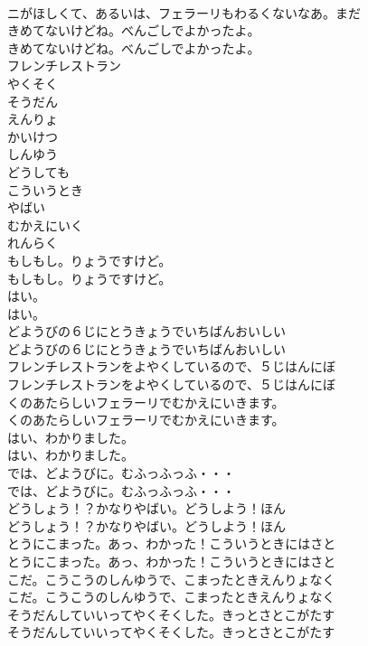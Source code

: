\documentclass[8pt]{extreport}
\begin{document}
\begin{CJK}{UTF8}{min}
\\	ニがほしくて、あるいは、フェラーリもわるくないなあ。まだ
\\	きめてないけどね。べんごしでよかったよ。
\\	きめてないけどね。べんごしでよかったよ。
\\	フレンチレストラン
\\	やくそく
\\	そうだん
\\	えんりょ
\\	かいけつ
\\	しんゆう
\\	どうしても
\\	こういうとき
\\	やばい
\\	むかえにいく
\\	れんらく
\\	もしもし。りょうですけど。
\\	もしもし。りょうですけど。
\\	はい。
\\	はい。
\\	どようびの６じにとうきょうでいちばんおいしい
\\	どようびの６じにとうきょうでいちばんおいしい
\\	フレンチレストランをよやくしているので、５じはんにぼ
\\	フレンチレストランをよやくしているので、５じはんにぼ
\\	くのあたらしいフェラーリでむかえにいきます。
\\	くのあたらしいフェラーリでむかえにいきます。
\\	はい、わかりました。
\\	はい、わかりました。
\\	では、どようびに。むふっふっふ・・・
\\	では、どようびに。むふっふっふ・・・
\\	どうしょう！？かなりやばい。どうしよう！ほん
\\	どうしょう！？かなりやばい。どうしよう！ほん
\\	とうにこまった。あっ、わかった！こういうときにはさと
\\	とうにこまった。あっ、わかった！こういうときにはさと
\\	こだ。こうこうのしんゆうで、こまったときえんりょなく
\\	こだ。こうこうのしんゆうで、こまったときえんりょなく
\\	そうだんしていいってやくそくした。きっとさとこがたす
\\	そうだんしていいってやくそくした。きっとさとこがたす

\end{CJK}
\end{document}
